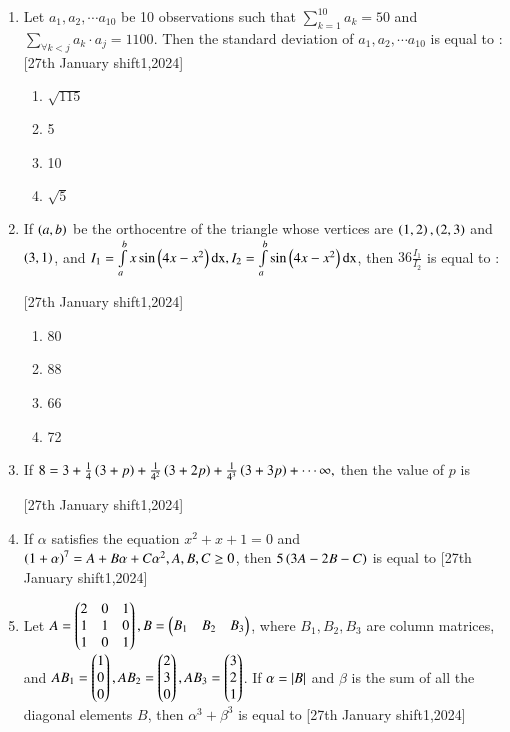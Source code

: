 \documentclass[journal]{IEEEtran}
\begin{document}
\begin{enumerate}[start=16]
\item Let $a_1, a_2, \cdots a_{10}$ be 10 observations such that  $\sum_{k=1}^{10} a_k=50$ and $\sum_{\forall k < j} a_k \cdot a_j = 1100$. Then the standard deviation of $a_1,a_2,\cdots a_{10}$ is equal to : \hfill{[27th January shift1,2024]}
\begin{enumerate}
    \item $\sqrt{115}$
    \item 5
    \item 10
    \item $\sqrt{5}$
\end{enumerate}

\item If $\left(a,b\right)$ be the orthocentre of the triangle whose vertices are $\left(1,2\right), \left(2,3\right)$ and $\left(3,1\right)$, and $I_1=\int\limits_a^b x\sin\left(4x-x^2\right)\text{dx}, I_2=\int\limits_a^b \sin\left(4x-x^2\right)\text{dx}$, then $36\frac{I_1}{I_2}$ is equal to :

    \hfill{[27th January shift1,2024]}
\begin{enumerate}
    \item 80
    \item 88
    \item 66
    \item 72
\end{enumerate}







\item If $8=3+\frac{1}{4}\left(3+p\right)+\frac{1}{4^2}\left(3+2p\right)+\frac{1}{4^3}\left(3+3p\right)+\cdots\infty,$ then the value of $p$ is \underline{\hspace{1cm}} 

    \hfill{[27th January shift1,2024]}\\

\item If $\alpha$ satisfies the equation $x^2+x+1=0$ and $\left(1+\alpha\right)^7=A+B\alpha+C\alpha^{2}, A, B,C \geq 0$, then $5\left(3A-2B-C\right)$ is equal to \underline{\hspace{1cm}} \hfill{[27th January shift1,2024]}\\

\item Let $A=\begin{pmatrix}2&0&1\\1&1&0\\1&0&1\end{pmatrix}, B=\begin{pmatrix}B_1&B_2&B_3\end{pmatrix}$, where $B_1,B_2,B_3$ are column matrices, and $AB_1=\begin{pmatrix}1\\0\\0\end{pmatrix}, AB_2=\begin{pmatrix}2\\3\\0\end{pmatrix}, AB_3=\begin{pmatrix}3\\2\\1\end{pmatrix}$. If $\alpha=\left\vert B\right\vert$ and $\beta$ is the sum of all the diagonal elements $B$, then $\alpha ^3+\beta ^3$ is equal to  \underline{\hspace{1cm}} \hfill{[27th January shift1,2024]}\\


\end{enumerate}
\end{document}
